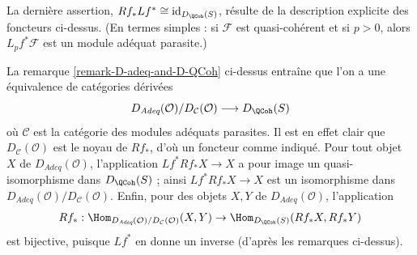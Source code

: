 \begin{remark}
\medskip\noindent
La dernière assertion,
$Rf_* Lf^* \cong \text{id}_{D_\QCoh(S)}$,
résulte de la description explicite des foncteurs ci-dessus.
(En termes simples : si $\mathcal{F}$ est quasi-cohérent et si $p > 0$, alors
$L_pf^*\mathcal{F}$ est un module adéquat parasite.)
\end{remark}


\begin{remark}
\label{remark-conclusion}
La remarque \ref{remark-D-adeq-and-D-QCoh}
ci-dessus entraîne que l'on a une équivalence de catégories dérivées
$$
D_{\textit{Adeq}}(\mathcal{O})/D_\mathcal{C}(\mathcal{O})
\longrightarrow
D_\QCoh(S)
$$
où $\mathcal{C}$ est la catégorie des modules adéquats parasites.
Il est en effet clair que $D_\mathcal{C}(\mathcal{O})$ est le noyau
de $Rf_*$, d'où un foncteur comme indiqué. Pour tout objet $X$ de
$D_{\textit{Adeq}}(\mathcal{O})$, l'application $Lf^*Rf_*X \to X$ a pour image
un quasi-isomorphisme dans $D_\QCoh(S)$ ; ainsi
$Lf^*Rf_*X \to X$ est un isomorphisme dans
$D_{\textit{Adeq}}(\mathcal{O})/D_\mathcal{C}(\mathcal{O})$.
Enfin, pour des objets $X, Y$ de $D_{\textit{Adeq}}(\mathcal{O})$,
l'application
$$
Rf_* :
\Hom_{D_{\textit{Adeq}}(\mathcal{O})/D_\mathcal{C}(\mathcal{O})}(X, Y)
\to
\Hom_{D_\QCoh(S)}(Rf_*X, Rf_*Y)
$$
est bijective, puisque $Lf^*$ en donne un inverse (d'après les remarques ci-dessus).
\end{remark}















